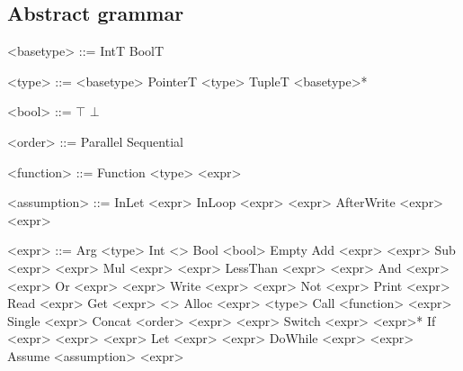 \subsection*{Abstract grammar}
  \begin{minipage}[t]{0.45\linewidth}
    \begin{grammar}
      <basetype> ::= IntT \alt BoolT

      <type> ::= <basetype> \alt PointerT <type> \alt TupleT <basetype>*

      <bool> ::= $\top$ \alt $\bot$

      <order> ::= Parallel \alt Sequential

      <function> ::= Function <type> <expr>

      <assumption> ::= InLet <expr>
      \alt InLoop <expr> <expr>
      \alt AfterWrite <expr> <expr>
    \end{grammar}
  \end{minipage}\hfill%
  \begin{minipage}[t]{0.5\linewidth}
    \begin{grammar}
      <expr> ::= Arg <type>
      \alt Int <\N>
      \alt Bool <bool>
      \alt Empty
      \alt Add <expr> <expr>
      \alt Sub <expr> <expr>
      \alt Mul <expr> <expr>
      \alt LessThan <expr> <expr>
      \alt And <expr> <expr>
      \alt Or <expr> <expr>
      \alt Write <expr> <expr>
      \alt Not <expr>
      \alt Print <expr>
      \alt Read <expr>
      \alt Get <expr> <\N>
      \alt Alloc <expr> <type>
      \alt Call <function> <expr>
      \alt Single <expr>
      \alt Concat <order> <expr> <expr>
      \alt Switch <expr> <expr>*
      \alt If <expr> <expr> <expr>
      \alt Let <expr> <expr>
      \alt DoWhile <expr> <expr>
      \alt Assume <assumption> <expr>
    \end{grammar}%
    \end{minipage}%


